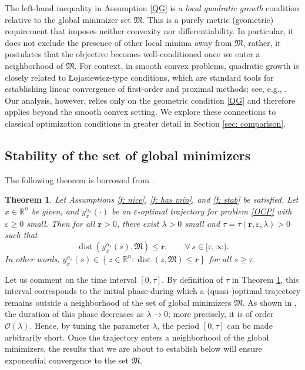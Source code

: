 \documentclass[12pt]{amsart}
\numberwithin{equation}{section}
\theoremstyle{plain}
\newtheorem{theorem}{Theorem}[section]
\begin{document}
The left-hand inequality in Assumption \ref{QG} is a \emph{local quadratic growth} condition relative to the global minimizer set $\mathfrak{M}$. This is a purely metric (geometric) requirement that imposes neither convexity nor differentiability. In particular, it does not exclude the presence of other local minima away from $\mathfrak{M}$, rather, it postulates that the objective becomes well-conditioned once we enter a neighborhood of $\mathfrak{M}$. For context, in smooth convex problems, quadratic growth is closely related to \L{}ojasiewicz-type conditions, which are standard tools for establishing linear convergence of first-order and proximal methods; see, e.g., \cite{aujol2023convergence,drusvyatskiy2018error,polyak1963gradient}. Our analysis, however, relies only on the geometric condition \ref{QG} and therefore applies beyond the smooth convex setting. We explore these connections to classical optimization conditions in greater detail in Section \ref{sec: comparison}.


\subsection{Stability of the set of global minimizers}\label{sec: stab}

The following theorem is borrowed from \cite[Theorem 5.1]{huang2025control}. 

\begin{theorem}\label{thm: practical}
Let Assumptions \ref{f: nice}, \ref{f: has min}, and \ref{f: stab} be satisfied. Let $x\in\mathbb{R}^{n}$ be given, and $y_{x}^{\alpha_{\varepsilon}}(\cdot)$ be an $\varepsilon$-optimal trajectory for problem \eqref{OCP} with $\varepsilon\geq 0$ small. 
Then for all $\mathbf{r}>0$, there exist $\lambda>0$ small and $\tau = \tau(\mathbf{r},\varepsilon, \lambda)>0$ such that 
\begin{equation*}
    \operatorname{dist}\left(y_{x}^{\alpha_{\varepsilon}}(s), \mathfrak{M}\right) \leq \mathbf{r}, \quad \quad \forall\, s\in [\tau, \infty).
\end{equation*}
In other words, $y_{x}^{\alpha_{\varepsilon}}(s) \in \left\{z\in \mathbb{R}^{n}: \operatorname{dist}(z,\mathfrak{M})\leq \mathbf{r}\right\}$ for all $s\geq \tau$. 
\end{theorem}

Let us comment on the time interval $[0,\tau]$. By definition of $\tau$ in Theorem \ref{thm: practical}, this interval corresponds to the initial phase during which a (quasi-)optimal trajectory remains outside a neighborhood of the set of global minimizers $\mathfrak{M}$. As shown in \cite[Theorem 3.4]{huang2025control}, the duration of this phase decreases as $\lambda \to 0$; more precisely, it is of order $\mathcal{O}(\lambda)$. Hence, by tuning the parameter $\lambda$, the period $[0,\tau]$ can be made arbitrarily short. Once the trajectory enters a neighborhood of the global minimizers, the results that we are about to establish below will ensure exponential convergence to the set $\mathfrak{M}$.
\end{document}
